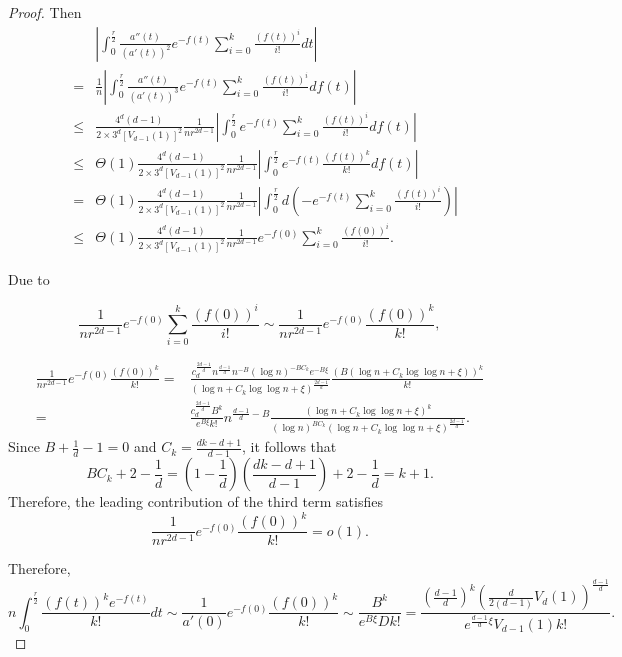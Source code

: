 \documentclass[10pt,a4paper]{amsart}
\begin{document}
\begin{proof}
	Then
	\begin{eqnarray*}
		&&\left|\int_{0}^{\frac r2} \frac{a''(t)}{(a'(t))^2}e^{-f(t)}\sum_{i=0}^{k}\frac{(f(t))^i}{i!}dt\right|\\
		&=&\frac{1}{n}\left|\int_{0}^{\frac r2} \frac{a''(t)}{(a'(t))^3}e^{-f(t)}\sum_{i=0}^{k}\frac{(f(t))^i}{i!}df(t)\right|\\
		&\leq & \frac{4^d(d-1)}{2\times 3^d[V_{d-1}(1)]^2} \frac{1}{nr^{2d-1}} \left|\int_{0}^{\frac r2} e^{-f(t)}\sum_{i=0}^{k}\frac{(f(t))^i}{i!}df(t)\right|\\
		&\leq & \Theta(1)\frac{4^d(d-1)}{2\times 3^d[V_{d-1}(1)]^2} \frac{1}{nr^{2d-1}} \left|\int_{0}^{\frac r2} e^{-f(t)}\frac{(f(t))^k}{k!}df(t)\right|\\
		&= & \Theta(1)\frac{4^d(d-1)}{2\times 3^d[V_{d-1}(1)]^2} \frac{1}{nr^{2d-1}} \left|\int_{0}^{\frac r2} d\left(-e^{-f(t)}\sum_{i=0}^{k}\frac{(f(t))^i}{i!}\right) \right|\\
		&\leq & \Theta(1)\frac{4^d(d-1)}{2\times 3^d[V_{d-1}(1)]^2} \frac{1}{nr^{2d-1}}e^{-f(0)}\sum_{i=0}^{k}\frac{(f(0))^i}{i!}.
	\end{eqnarray*}
	
	Due to
	
	$$
	\frac{1}{nr^{2d-1}}e^{-f(0)}\sum_{i=0}^{k}\frac{(f(0))^i}{i!}  \sim
	\frac{1}{nr^{2d-1}}e^{-f(0)}\frac{(f(0))^k}{k!} ,
	$$
	
	\begin{equation*}
		\begin{aligned}
			\frac{1}{nr^{2d-1}}e^{-f(0)}\frac{(f(0))^k}{k!} = & \frac{c_d^{\frac{2d-1}{d}}n^{\frac{d-1}{d}}n^{-B}(\log n)^{-BC_k}e^{-B\xi}}{\left(\log n+ C_k \log\log n+\xi\right)^{\frac{2d-1}{d}}} \frac{(B\left( \log n+ C_k \log\log n+\xi\right))^k}{k!} \\
			= & \frac{c_d^{\frac{2d-1}{d}}B^k}{e^{B\xi}k!}n^{\frac{d-1}{d}-B}\frac{\left( \log n+ C_k \log\log n+\xi\right)^k}{(\log n)^{BC_k}\left(\log n+ C_k \log\log n+\xi\right)^{\frac{2d-1}{d}}}.
		\end{aligned}
	\end{equation*}
	Since $B + \frac{1}{d} - 1 = 0$ and $C_k=\frac{dk-d+1}{d-1}$, it follows that
	$$
	BC_k + 2 - \frac{1}{d} = \left(1-\frac{1}{d}\right)\left(\frac{dk-d+1}{d-1}\right)+2-\frac{1}{d} = k + 1.
	$$
	Therefore, the leading contribution of the third term satisfies
	$$
	\frac{1}{nr^{2d-1}}e^{-f(0)}\frac{(f(0))^k}{k!} = o(1).
	$$
	

	Therefore,
	$$
	n\int_{0}^{\frac r2} \frac{(f(t))^ke^{-f(t)}}{k!}dt\sim \frac{1}{a'(0)}e^{-f(0)}\frac{(f(0))^k}{k!} \sim \frac{B^k}{e^{B\xi}Dk!}=\frac{\left(\frac{d-1}{d}\right)^k\left(\frac{d}{2(d-1)}V_d(1)\right)^{\frac{d-1}{d}}}{e^{\frac{d-1}{d}\xi}{V_{d-1}(1)}k!}.
	$$	
\end{proof}
\end{document}
